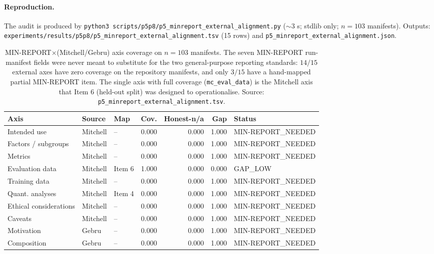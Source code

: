 \documentclass{article}  \usepackage[preprint,nonatbib]{neurips_2026} \usepackage[numbers]{natbib}
\begin{document}
\paragraph{Reproduction.} The audit is produced by
\texttt{python3 scripts/p5p8/p5\_minreport\_external\_alignment.py}
($\sim$3 s; stdlib only; $n = 103$ manifests).
Outputs:
\texttt{experiments/results/p5p8/p5\_minreport\_external\_alignment.tsv}
(15 rows) and \texttt{p5\_minreport\_external\_alignment.json}.

\begin{table}[t]
\centering
\caption{MIN-REPORT$\times$(Mitchell/Gebru) axis coverage on
$n{=}103$ manifests. The seven MIN-REPORT run-manifest fields were never meant to
substitute for the two general-purpose reporting standards: $14/15$
external axes have zero coverage on the repository manifests, and only
$3/15$ have a hand-mapped partial MIN-REPORT item. The single axis
with full coverage (\texttt{mc\_eval\_data}) is the Mitchell axis
that Item 6 (held-out split) was designed to operationalise.
Source: \texttt{p5\_minreport\_external\_alignment.tsv}.}
\label{tab:p5-external-alignment}
\begin{tabular}{lllrrrl}
\toprule
Axis & Source & Map & Cov. & Honest-n/a & Gap & Status \\
\midrule
Intended use          & Mitchell & --  & 0.000 & 0.000 & 1.000 & MIN-REPORT\_NEEDED \\
Factors / subgroups   & Mitchell & --  & 0.000 & 0.000 & 1.000 & MIN-REPORT\_NEEDED \\
Metrics               & Mitchell & --  & 0.000 & 0.000 & 1.000 & MIN-REPORT\_NEEDED \\
Evaluation data       & Mitchell & Item 6 & 1.000 & 0.000 & 0.000 & GAP\_LOW \\
Training data         & Mitchell & --  & 0.000 & 0.000 & 1.000 & MIN-REPORT\_NEEDED \\
Quant. analyses       & Mitchell & Item 4 & 0.000 & 0.000 & 1.000 & MIN-REPORT\_NEEDED \\
Ethical considerations & Mitchell & -- & 0.000 & 0.000 & 1.000 & MIN-REPORT\_NEEDED \\
Caveats               & Mitchell & --  & 0.000 & 0.000 & 1.000 & MIN-REPORT\_NEEDED \\
\midrule
Motivation            & Gebru    & --  & 0.000 & 0.000 & 1.000 & MIN-REPORT\_NEEDED \\
Composition           & Gebru    & --  & 0.000 & 0.000 & 1.000 & MIN-REPORT\_NEEDED \\

\end{tabular}
\end{table}
\end{document}
